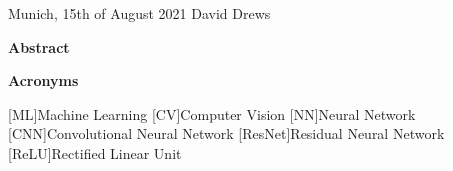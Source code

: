 \documentclass[11pt,
               a4paper,
               bibtotoc,
               idxtotoc,
               headsepline,
               footsepline,
               footexclude,
               BCOR12mm,
               DIV13,
               openany,   %
               ]
               {scrbook}
\def\author{David Drews}
\def\date{15th of August 2021}
\begin{document}
\vspace{15mm}
\noindent
Munich, \date \hspace{5cm} \author
\cleardoubleemptypage


{}
\vspace*{2cm}
\begin{center}
    {\Large \bf Abstract}
\end{center}
\vspace{1cm}

\lipsum[2]

\cleardoublepage


{}
\vspace*{2cm}
\begin{center}
	{\Large \bf Acronyms}
\end{center}
\vspace{1cm}

\begin{acronym}[ResNet] %
	[ML]{Machine Learning}
	[CV]{Computer Vision}
	[NN]{Neural Network}
	[CNN]{Convolutional Neural Network}
	[ResNet]{Residual Neural Network}
	[ReLU]{Rectified Linear Unit}
\end{acronym}

\cleardoublepage


\tableofcontents
\thispagestyle{empty}
\cleardoubleemptypage

\end{document}
